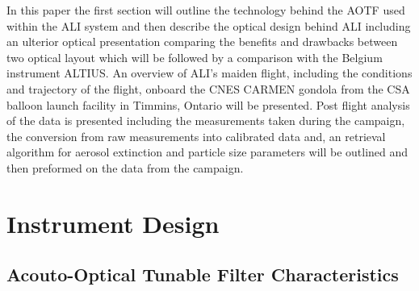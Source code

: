 \documentclass[12pt]{article}
\begin{document}

In this paper the first section will outline the technology behind the AOTF used within the ALI system and then describe the optical design behind ALI including an ulterior optical presentation comparing the benefits and drawbacks between two optical layout which will be followed by a comparison with the Belgium instrument ALTIUS. An overview of ALI's maiden flight, including the conditions and trajectory of the flight, onboard the CNES CARMEN gondola from the CSA balloon launch facility in Timmins, Ontario will be presented. Post flight analysis of the data is presented including the measurements taken during the campaign, the conversion from raw measurements into calibrated data and, an retrieval algorithm for aerosol extinction and particle size parameters will be outlined and then preformed on the data from the campaign.

\section{Instrument Design}

\subsection{Acouto-Optical Tunable Filter Characteristics}
\end{document}
